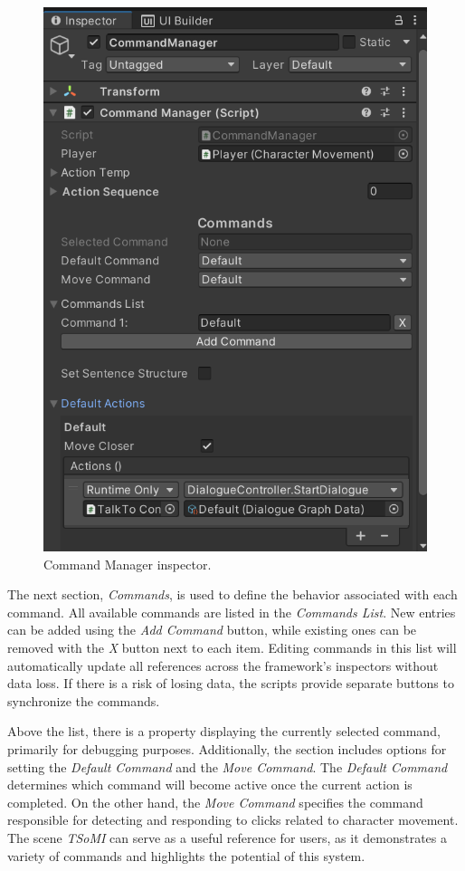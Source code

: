 \begin{figure}[H]
\centering
\includegraphics[width=.7\linewidth]{img/User doc/command_manager.png}
\caption{Command Manager inspector.}
\label{fig:Manual-CM}
\end{figure}

The next section, \textit{Commands}, is used to define the behavior associated with each command. All available commands are listed in the \textit{Commands List}. New entries can be added using the \textit{Add Command} button, while existing ones can be removed with the \textit{X} button next to each item. Editing commands in this list will automatically update all references across the framework’s inspectors without data loss. If there is a risk of losing data, the scripts provide separate buttons to synchronize the commands.

Above the list, there is a property displaying the currently selected command, primarily for debugging purposes. Additionally, the section includes options for setting the \textit{Default Command} and the \textit{Move Command}. The \textit{Default Command} determines which command will become active once the current action is completed. On the other hand, the \textit{Move Command} specifies the command responsible for detecting and responding to clicks related to character movement. The scene \textit{TSoMI} can serve as a useful reference for users, as it demonstrates a variety of commands and highlights the potential of this system.

